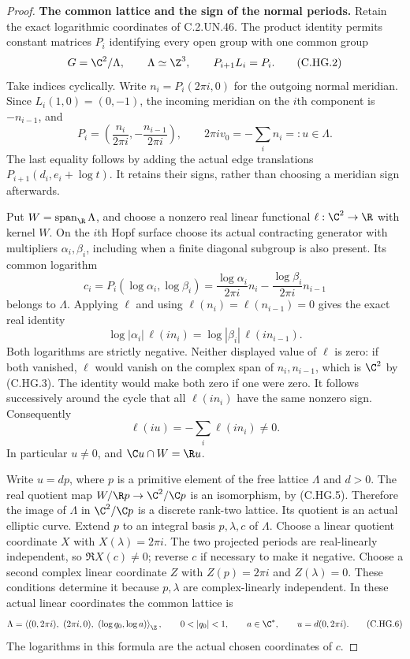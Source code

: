 \begin{proof}
\par\medskip\noindent\textbf{The common lattice and the sign of the normal periods.}
Retain the exact logarithmic coordinates of C.2.UN.46.
The product identity permits constant matrices $P_i$
identifying every open group with one common group
\[
                  G=\C^2/\Lambda,\qquad \Lambda\simeq\Z^3,
                  \qquad P_{i+1}L_i=P_i.
\tag{C.HG.2}
\]
Take indices cyclically. Write $n_i=P_i(2\pi i,0)$
for the outgoing normal meridian. Since
$L_i(1,0)=(0,-1)$, the incoming meridian on the
$i$th component is $-n_{i-1}$, and
\[
 P_i=\left(\frac{n_i}{2\pi i},
                   -\frac{n_{i-1}}{2\pi i}\right),
 \qquad
 2\pi i v_0=-\sum_i n_i=:u\in\Lambda.
\tag{C.HG.3}
\]
The last equality follows by adding the actual
edge translations $P_{i+1}(d_i,e_i+\log t)$.
It retains their signs, rather than choosing a
meridian sign afterwards.

Put $W=\operatorname{span}_{\R}\Lambda$, and choose
a nonzero real linear functional $\ell:\C^2\to\R$
with kernel $W$. On the $i$th Hopf surface choose
its actual contracting generator with multipliers
$\alpha_i,\beta_i$, including when a finite diagonal
subgroup is also present. Its common logarithm
\[
 c_i=P_i(\log\alpha_i,\log\beta_i)
       =\frac{\log\alpha_i}{2\pi i}n_i
          -\frac{\log\beta_i}{2\pi i}n_{i-1}
\]
belongs to $\Lambda$. Applying $\ell$ and using
$\ell(n_i)=\ell(n_{i-1})=0$ gives the exact real
identity
\[
 \log|\alpha_i|\,\ell(i n_i)
       =\log|\beta_i|\,\ell(i n_{i-1}).
\tag{C.HG.4}
\]
Both logarithms are strictly negative.
Neither displayed value of $\ell$ is zero: if
both vanished, $\ell$ would vanish on the complex
span of $n_i,n_{i-1}$, which is $\C^2$ by
(C.HG.3). The identity would make both zero if
one were zero. It follows successively around
the cycle that all $\ell(i n_i)$ have the same
nonzero sign. Consequently
\[
                       \ell(iu)=-\sum_i\ell(i n_i)\ne0.
\tag{C.HG.5}
\]
In particular $u\ne0$, and $\C u\cap W=\R u$.

Write $u=d p$, where $p$ is a primitive element
of the free lattice $\Lambda$ and $d>0$.
The real quotient map
$W/\R p\to\C^2/\C p$ is an isomorphism, by
(C.HG.5). Therefore the image of $\Lambda$ in
$\C^2/\C p$ is a discrete rank-two lattice.
Its quotient is an actual elliptic curve.
Extend $p$ to an integral basis $p,\lambda,c$
of $\Lambda$. Choose a linear quotient
coordinate $X$ with $X(\lambda)=2\pi i$.
The two projected periods are real-linearly
independent, so $\Re X(c)\ne0$; reverse $c$
if necessary to make it negative. Choose a
second complex linear coordinate $Z$ with
$Z(p)=2\pi i$ and $Z(\lambda)=0$. These
conditions determine it because $p,\lambda$
are complex-linearly independent. In these
actual linear coordinates the common lattice
is
\[
 \Lambda=\left\langle
     (0,2\pi i),\ (2\pi i,0),\
     (\log q_0,\log a)\right\rangle_{\Z},
 \qquad 0<|q_0|<1,\qquad a\in\C^*,
 \qquad u=d(0,2\pi i).
\tag{C.HG.6}
\]
The logarithms in this formula are the actual
chosen coordinates of $c$.


\end{proof}
